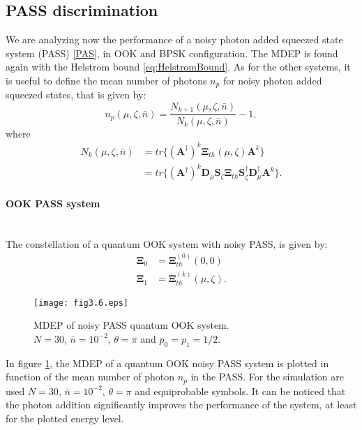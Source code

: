     \subsection{PASS discrimination}
        We are analyzing now the performance of a noisy photon added squeezed state system (PASS)
        \ref{PAS}, in OOK and BPSK configuration. The MDEP is found again with the Helstrom bound
        \ref{eq:HelstromBound}.
        As for the other systems, it is useful to define the mean number of photons $n_p$ for noisy 
        photon added squeezed states, that is given by:
        \begin{equation}
            n_p(\mu,\zeta,\bar{n}) = \frac{N_{k+1}(\mu,\zeta,\bar{n})}{N_k(\mu,\zeta,\bar{n})}-1,
            \label{eq:np_PASS}
        \end{equation}
        where
        \begin{equation}
            \begin{split}
                N_k(\mu,\zeta,\bar{n}) &= tr\{(\pmb{A}^\dagger)^k \pmb{\Xi}_{th}(\mu,\zeta) \pmb{A}^k\}\\
                                       &= tr\{(\pmb{A}^\dagger)^k \pmb{D}_\mu \pmb{S}_\zeta \pmb{\Xi}_{th}
                                        \pmb{S}_\zeta^\dagger \pmb{D}_\mu^\dagger \pmb{A}^k\}.
            \end{split}
        \end{equation}

        \paragraph{OOK PASS system}\mbox{}\\
        The constellation of a quantum OOK system with noisy PASS, is given by:
        \begin{equation}
            \begin{split}
                \pmb{\Xi}_0 &= \pmb{\Xi}_{th}^{(0)}(0,0)\\
                \pmb{\Xi}_1 &= \pmb{\Xi}_{th}^{(k)}(\mu,\zeta).
            \end{split}
        \end{equation}
        \begin{figure}[tbp]
            \begin{center}
                \texttt{[image: fig3.6.eps]}
                \caption{MDEP of noisy PASS quantum OOK system.\\
                $N=30$, $\bar{n}=10^{-2}$, $\theta=\pi$ and $p_0=p_1=1/2$.}
                \label{fig:3.6}
            \end{center}
        \end{figure}
        In figure \ref{fig:3.6}, the MDEP of a quantum OOK noisy PASS system is plotted in function
        of the mean number of photon $n_p$ in the PASS. For the simulation are used $N=30$, $\bar{n}=10^{-2}$, $\theta=\pi$ and
        equiprobable symbols.
        It can be noticed that the photon addition significantly improves the performance of the system,
        at least for the plotted energy level.

